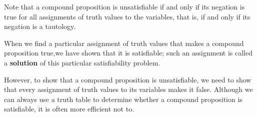 \begin{center}
\noindent{}
\end{center}
\begin{center}
\noindent{}
\end{center}

\begin{tcolorbox}[colback=white, colframe=gray!60, title=Remark 1]
Note that a compound proposition is
unsatisfiable if and only if its negation is true for all assignments of truth values to the variables,
that is, if and only if its negation is a tautology.
\end{tcolorbox}
\begin{tcolorbox}[colback=white, colframe=gray!60, title=Remark 2]
When we find a particular assignment of truth values that makes a compound proposition
true,we have shown that it is satisfiable; such an assignment is called a \textbf{solution} of this particular
satisfiability problem.
\end{tcolorbox}
\begin{tcolorbox}[colback=white, colframe=gray!60, title=Remark 3]
However, to show that a compound proposition is unsatisfiable, we need
to show that every assignment of truth values to its variables makes it false. Although we can
always use a truth table to determine whether a compound proposition is satisfiable, it is often
more efficient not to.
\end{tcolorbox}

